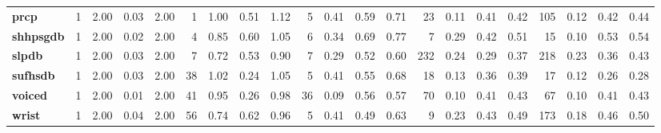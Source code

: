 \begin{tabular}{l|rrrr|rrrr|rrrr|rrrr|rrrr}
	\textbf{prcp         } &        1 &                     2.00 &                  0.03 &          2.00 &    1 &                     1.00 &                  0.51 &          1.12 &               5 &                     0.41 &                  0.59 &          0.71 &               23 &                     0.11 &                  0.41 &          0.42 &     105 &                     0.12 &                  0.42 &          0.44 \\
	\textbf{shhpsgdb     } &        1 &                     2.00 &                  0.02 &          2.00 &    4 &                     0.85 &                  0.60 &          1.05 &               6 &                     0.34 &                  0.69 &          0.77 &                7 &                     0.29 &                  0.42 &          0.51 &      15 &                     0.10 &                  0.53 &          0.54 \\
	\textbf{slpdb        } &        1 &                     2.00 &                  0.03 &          2.00 &    7 &                     0.72 &                  0.53 &          0.90 &               7 &                     0.29 &                  0.52 &          0.60 &              232 &                     0.24 &                  0.29 &          0.37 &     218 &                     0.23 &                  0.36 &          0.43 \\
	\textbf{sufhsdb      } &        1 &                     2.00 &                  0.03 &          2.00 &   38 &                     1.02 &                  0.24 &          1.05 &               5 &                     0.41 &                  0.55 &          0.68 &               18 &                     0.13 &                  0.36 &          0.39 &      17 &                     0.12 &                  0.26 &          0.28 \\
	\textbf{voiced       } &        1 &                     2.00 &                  0.01 &          2.00 &   41 &                     0.95 &                  0.26 &          0.98 &              36 &                     0.09 &                  0.56 &          0.57 &               70 &                     0.10 &                  0.41 &          0.43 &      67 &                     0.10 &                  0.41 &          0.43 \\
	\textbf{wrist        } &        1 &                     2.00 &                  0.04 &          2.00 &   56 &                     0.74 &                  0.62 &          0.96 &               5 &                     0.41 &                  0.49 &          0.63 &                9 &                     0.23 &                  0.43 &          0.49 &     173 &                     0.18 &                  0.46 &          0.50 \\
	\bottomrule
\end{tabular}
